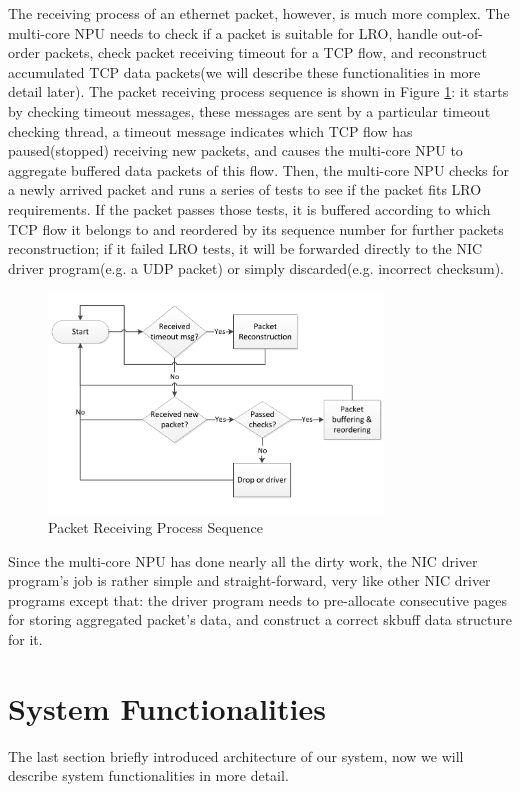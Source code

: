 \documentclass[conference]{IEEEtran}
\begin{document}
The receiving process of an ethernet packet, however, is much more complex. The multi-core NPU needs to check if a packet is suitable for LRO, handle out-of-order packets, check packet receiving timeout for a TCP flow, and reconstruct accumulated TCP data packets(we will describe these functionalities in more detail later). The packet receiving process sequence is shown in Figure \ref{packet receiving process sequence}: it starts by checking timeout messages, these messages are sent by a particular timeout checking thread, a timeout message indicates which TCP flow has paused(stopped) receiving new packets, and causes the multi-core NPU to aggregate buffered data packets of this flow. Then, the multi-core NPU checks for a newly arrived packet and runs a series of tests to see if the packet fits LRO requirements. If the packet passes those tests, it is buffered according to which TCP flow it belongs to and reordered by its sequence number for further packets reconstruction; if it failed LRO tests, it will be forwarded directly to the NIC driver program(e.g. a UDP packet) or simply discarded(e.g. incorrect checksum).
\begin{figure}[!t]
\centering
\includegraphics[width=3.5in]{packet_receiving_process_sequence}
\caption{Packet Receiving Process Sequence}
\label{packet receiving process sequence}
\end{figure}
Since the multi-core NPU has done nearly all the dirty work, the NIC driver program's job is rather simple and straight-forward, very like other NIC driver programs except that: the driver program needs to pre-allocate consecutive pages for storing aggregated packet's data, and construct a correct skbuff data structure for it.
\section{System Functionalities}
The last section briefly introduced architecture of our system, now we will describe system functionalities in more detail.
\end{document}

